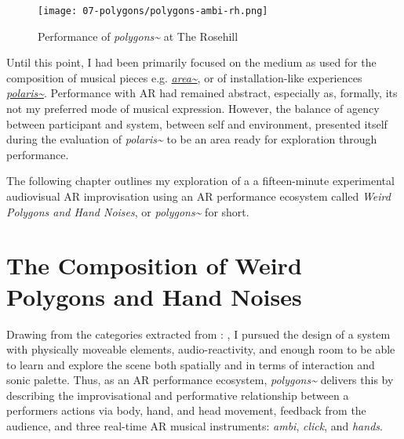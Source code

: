 \begin{figure}
    \centering
    \texttt{[image: 07-polygons/polygons-ambi-rh.png]}
    \caption{Performance of \textit{polygons\textasciitilde{}} at The Rosehill}
    \label{fig: polygons-ambi-rh}
\end{figure}

Until this point, I had been primarily focused on the medium as used for the composition of musical pieces e.g. \hyperref[sec: area]{\textit{area\textasciitilde{}}}, or of installation-like experiences \hyperref[sec: polaris]{\textit{polaris\textasciitilde{}}}. Performance with AR had remained abstract, especially as, formally, its not my preferred mode of musical expression. However, the balance of agency between participant and system, between self and environment, presented itself during the evaluation of \textit{polaris\textasciitilde{}} to be an area ready for exploration through performance. 

The following chapter outlines my exploration of a a fifteen-minute experimental audiovisual AR improvisation using an AR performance ecosystem called \textit{Weird Polygons and Hand Noises}, or \textit{polygons\textasciitilde{}} for short.



\section{The Composition of Weird Polygons and Hand Noises} \label{sec: polygons-composition}

Drawing from the categories extracted from : , I pursued the design of a system with physically moveable elements, audio-reactivity, and enough room to be able to learn and explore the scene both spatially and in terms of interaction and sonic palette. Thus, as an AR performance ecosystem, \textit{polygons\textasciitilde{}} delivers this by describing the improvisational and performative relationship between a performers actions via body, hand, and head movement, feedback from the audience, and three real-time AR musical instruments: \textit{ambi}, \textit{click}, and \textit{hands}. 

